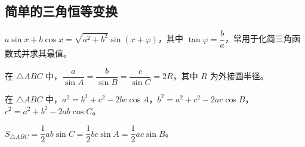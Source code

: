 \subsection{简单的三角恒等变换}
\begin{definition}[辅助角公式]
$a\sin x+b\cos x=\sqrt{a^2+b^2}\sin(x+\varphi)$，其中 $\tan\varphi=\dfrac{b}{a}$，常用于化简三角函数式并求其最值。
\end{definition}
\begin{theorem}[正弦定理]
在 $\triangle ABC$ 中，$\dfrac{a}{\sin A}=\dfrac{b}{\sin B}=\dfrac{c}{\sin C}=2R$，其中 $R$ 为外接圆半径。
\end{theorem}
\begin{theorem}[余弦定理]
在 $\triangle ABC$ 中，$a^2=b^2+c^2-2bc\cos A$，$b^2=a^2+c^2-2ac\cos B$，$c^2=a^2+b^2-2ab\cos C$。
\end{theorem}
\begin{corollary}[三角形面积公式]
$S_{\triangle ABC}=\dfrac{1}{2}ab\sin C=\dfrac{1}{2}bc\sin A=\dfrac{1}{2}ac\sin B$。
\end{corollary}
